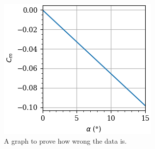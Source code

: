 \documentclass[12pt]{article} %
\begin{document}
\begin{figure}[H]
    \centering
    \includegraphics[width=\linewidth]{plot.png}
    \caption{A graph to prove how wrong the data is.}
    \label{fig:bar}
\end{figure}
\end{document}
